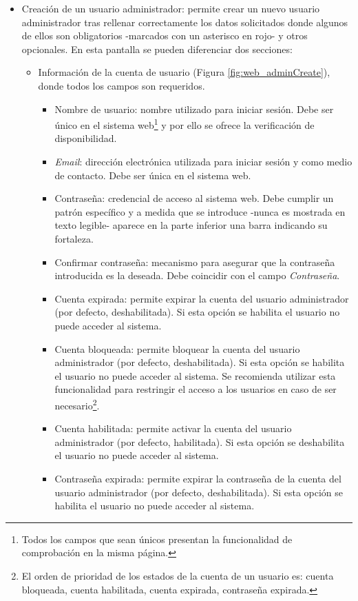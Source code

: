 \documentclass[12pt,a4paper, twoside]{report}
\begin{document}
\begin{itemize}
		\item Creación de un usuario administrador: permite crear un nuevo usuario administrador tras rellenar correctamente los datos solicitados donde algunos de ellos son obligatorios -marcados con un asterisco en rojo- y otros opcionales. En esta pantalla se pueden diferenciar dos secciones:
				
		\begin{itemize}
			\item Información de la cuenta de usuario (Figura \ref{fig:web_adminCreate}), donde todos los campos son requeridos.
		 
		 	\begin{itemize}
		 		\item Nombre de usuario: nombre utilizado para iniciar sesión. Debe ser único en el sistema web\footnote{Todos los campos que sean únicos presentan la funcionalidad de comprobación en la misma página.} y por ello se ofrece la verificación de disponibilidad.
		 		\item \textit{Email}: dirección electrónica utilizada para iniciar sesión y como medio de contacto. Debe ser única en el sistema web.
		 		\item Contraseña: credencial de acceso al sistema web. Debe cumplir un patrón específico y a medida que se introduce -nunca es mostrada en texto legible- aparece en la parte inferior una barra indicando su fortaleza.
		 		\item Confirmar contraseña: mecanismo para asegurar que la contraseña introducida es la deseada. Debe coincidir con el campo \textit{Contraseña}.
		 		\item Cuenta expirada: permite expirar la cuenta del usuario administrador (por defecto, deshabilitada). Si esta opción se habilita el usuario no puede acceder al sistema.
		 		\item Cuenta bloqueada: permite bloquear la cuenta del usuario administrador (por defecto, deshabilitada). Si esta opción se habilita el usuario no puede acceder al sistema. Se recomienda utilizar esta funcionalidad para restringir el acceso a los usuarios en caso de ser necesario\footnote{El orden de prioridad de los estados de la cuenta de un usuario es: cuenta bloqueada, cuenta habilitada, cuenta expirada, contraseña expirada.}.
		 		\item Cuenta habilitada: permite activar la cuenta del usuario administrador (por defecto, habilitada). Si esta opción se deshabilita el usuario no puede acceder al sistema.
		 	 	\item Contraseña expirada: permite expirar la contraseña de la cuenta del usuario administrador (por defecto, deshabilitada). Si esta opción se habilita el usuario no puede acceder al sistema.
		 	\end{itemize}
			

\end{itemize}
\end{itemize}
\end{document}

